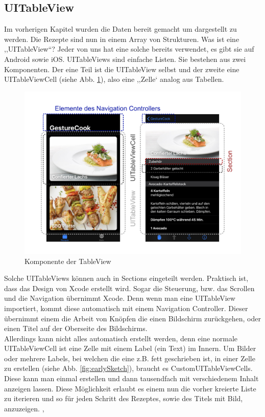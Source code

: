 \documentclass[12pt]{article}
\begin{document}
\subsection{UITableView}
Im vorherigen Kapitel wurden die Daten bereit gemacht um dargestellt zu werden. Die Rezepte sind nun in einem Array von Strukturen. Was ist eine ,,UITableView``? Jeder von uns hat eine solche bereits verwendet, es gibt sie auf Android sowie iOS. UITableViews sind einfache Listen. Sie bestehen aus zwei Komponenten. Der eine Teil ist die UITableView selbst und der zweite eine UITableViewCell (siehe Abb. \ref{fig:TableView}), also eine ,,Zelle` analog aus Tabellen. 
\begin{figure}
    \includegraphics[width=\linewidth]{pictures/TableView.jpg}
    \caption{Komponente der TableView}
    \label{fig:TableView}
\end{figure}
Solche UITableViews können auch in Sections eingeteilt werden. Praktisch ist, dass das Design von Xcode erstellt wird. Sogar die Steuerung, bzw. das Scrollen und die Navigation übernimmt Xcode. Denn wenn man eine UITableView importiert, kommt diese automatisch mit einem Navigation Controller. Dieser übernimmt einem die Arbeit von Knöpfen die einen Bildschirm zurückgehen, oder einen Titel auf der Oberseite des Bildschirms. \\ Allerdings kann nicht alles automatisch erstellt werden, denn eine normale UITableViewCell ist eine Zelle mit einem Label (ein Text) im Innern. Um Bilder oder mehrere Labels, bei welchen die eine z.B. fett geschrieben ist, in einer Zelle zu erstellen (siehe Abb.  \ref{fig:earlySketch}), braucht es CustomUITableViewCells. Diese kann man einmal erstellen und dann tausendfach mit verschiedenem Inhalt anzeigen lassen. Diese Möglichkeit erlaubt es einem nun die vorher kreierte Liste zu iterieren und so für jeden Schritt des Rezeptes, sowie des Titels mit Bild, anzuzeigen.  \cite{tableviewvideo}, \cite{tableViewApple}
\end{document}
